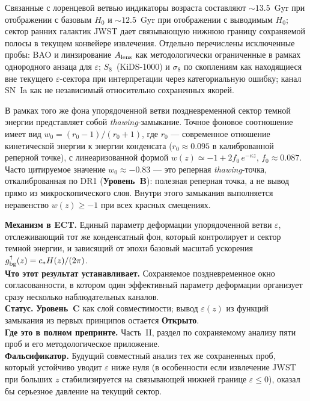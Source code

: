 \documentclass[11pt,a4paper]{article}
\newcommand{\statB}{\textbf{Уровень~B}}
\newcommand{\statC}{\textbf{Уровень~C}}
\newcommand{\statO}{\textbf{Открыто}}
\begin{document}
Связанные с лоренцевой ветвью индикаторы возраста составляют
$\sim 13.5$~Gyr при отображении с базовым $H_0$ и
$\sim 12.5$~Gyr при отображении с выводимым $H_0$; сектор ранних
галактик JWST дает связывающую нижнюю границу сохраняемой полосы
в текущем конвейере извлечения. Отдельно перечислены исключенные
пробы: BAO и линзирование $A_{\rm lens}$ как методологически
ограниченные в рамках однородного анзаца для $\varepsilon$;
$S_8$~(KiDS-1000) и $\sigma_8$ по скоплениям как находящиеся
вне текущего $\varepsilon$-сектора при интерпретации через
категориальную ошибку; канал SN~Ia как не независимый относительно
сохраненных якорей.

В рамках того же фона упорядоченной ветви поздневременной сектор
темной энергии представляет собой \emph{thawing}-замыкание.
Точное фоновое соотношение имеет вид
$w_0=(r_0-1)/(r_0+1)$, где $r_0$ — современное отношение
кинетической энергии к энергии конденсата
($r_0\approx 0.095$ в калиброванной реперной точке),
с линеаризованной формой
$w(z)\simeq -1+2f_0\,e^{-\kappa z}$,
$f_0\approx 0.087$.
Часто цитируемое значение $w_0\approx -0.83$ — это
реперная \emph{thawing}-точка, откалиброванная по DR1
(\statB): полезная реперная точка, а не вывод прямо из
микроскопического слоя.
Внутри этого замыкания выполняется неравенство $w(z)\ge -1$ при
всех красных смещениях.

\begin{mechbox}
\textbf{Механизм в ECT.}
Единый параметр деформации упорядоченной ветви $\varepsilon$,
отслеживающий тот же конденсатный фон, который контролирует и
сектор темной энергии, и зависящий от эпохи базовый масштаб
ускорения
$g^\dagger_{\rm bg}(z)=c_*H(z)/(2\pi)$.\\
\textbf{Что этот результат устанавливает.} Сохраняемое
поздневременное окно согласованности, в котором один эффективный
параметр деформации организует сразу несколько наблюдательных
каналов.\\
\textbf{Статус.} \statC{} как слой совместимости; вывод
$\varepsilon(z)$ из функций замыкания из первых принципов остается
\statO.\\
\textbf{Где это в полном препринте.} Часть~II, раздел по
сохраняемому анализу пяти проб и его методологическое приложение.\\
\textbf{Фальсификатор.} Будущий совместный анализ тех же
сохраненных проб, который устойчиво уводит $\varepsilon$ ниже
нуля (в особенности если извлечение JWST при больших $z$
стабилизируется на связывающей нижней границе
$\varepsilon\le 0$), оказал бы серьезное давление на текущий
сектор.
\end{mechbox}
\end{document}
